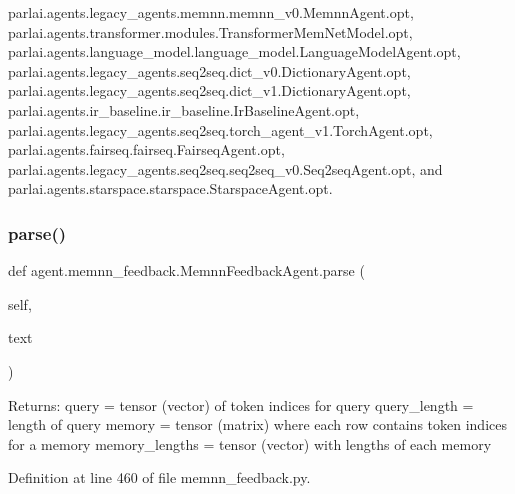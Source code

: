 parlai.\+agents.\+legacy\+\_\+agents.\+memnn.\+memnn\+\_\+v0.\+Memnn\+Agent.\+opt, parlai.\+agents.\+transformer.\+modules.\+Transformer\+Mem\+Net\+Model.\+opt, parlai.\+agents.\+language\+\_\+model.\+language\+\_\+model.\+Language\+Model\+Agent.\+opt, parlai.\+agents.\+legacy\+\_\+agents.\+seq2seq.\+dict\+\_\+v0.\+Dictionary\+Agent.\+opt, parlai.\+agents.\+legacy\+\_\+agents.\+seq2seq.\+dict\+\_\+v1.\+Dictionary\+Agent.\+opt, parlai.\+agents.\+ir\+\_\+baseline.\+ir\+\_\+baseline.\+Ir\+Baseline\+Agent.\+opt, parlai.\+agents.\+legacy\+\_\+agents.\+seq2seq.\+torch\+\_\+agent\+\_\+v1.\+Torch\+Agent.\+opt, parlai.\+agents.\+fairseq.\+fairseq.\+Fairseq\+Agent.\+opt, parlai.\+agents.\+legacy\+\_\+agents.\+seq2seq.\+seq2seq\+\_\+v0.\+Seq2seq\+Agent.\+opt, and parlai.\+agents.\+starspace.\+starspace.\+Starspace\+Agent.\+opt.

\mbox{\label{classagent_1_1memnn__feedback_1_1MemnnFeedbackAgent_a4decbb76deb6205e546de7e4ae09a774}} 
\subsubsection{\texorpdfstring{parse()}{parse()}}
{\footnotesize\ttfamily def agent.\+memnn\+\_\+feedback.\+Memnn\+Feedback\+Agent.\+parse (\begin{DoxyParamCaption}\item[{}]{self,  }\item[{}]{text }\end{DoxyParamCaption})}

\begin{DoxyVerb}Returns:
    query = tensor (vector) of token indices for query
    query_length = length of query
    memory = tensor (matrix) where each row contains token indices for a memory
    memory_lengths = tensor (vector) with lengths of each memory
\end{DoxyVerb}
 

Definition at line 460 of file memnn\+\_\+feedback.\+py.



